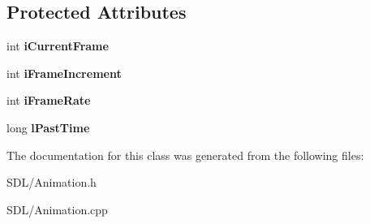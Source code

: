 \subsection*{Protected Attributes}
\begin{DoxyCompactItemize}
\item 
\hypertarget{class_animation_aa08785d681ca1561a8993a4e2b6836dd}{int {\bfseries i\+Current\+Frame}}\label{class_animation_aa08785d681ca1561a8993a4e2b6836dd}

\item 
\hypertarget{class_animation_a37a404d5332f5a1cfdcbbf4b2266f6df}{int {\bfseries i\+Frame\+Increment}}\label{class_animation_a37a404d5332f5a1cfdcbbf4b2266f6df}

\item 
\hypertarget{class_animation_a13a8758598d83105912bf2dc28fb6e74}{int {\bfseries i\+Frame\+Rate}}\label{class_animation_a13a8758598d83105912bf2dc28fb6e74}

\item 
\hypertarget{class_animation_a97892a7f4ed270540edc4ad298370d8a}{long {\bfseries l\+Past\+Time}}\label{class_animation_a97892a7f4ed270540edc4ad298370d8a}

\end{DoxyCompactItemize}


The documentation for this class was generated from the following files\+:\begin{DoxyCompactItemize}
\item 
S\+D\+L/Animation.\+h\item 
S\+D\+L/Animation.\+cpp\end{DoxyCompactItemize}
